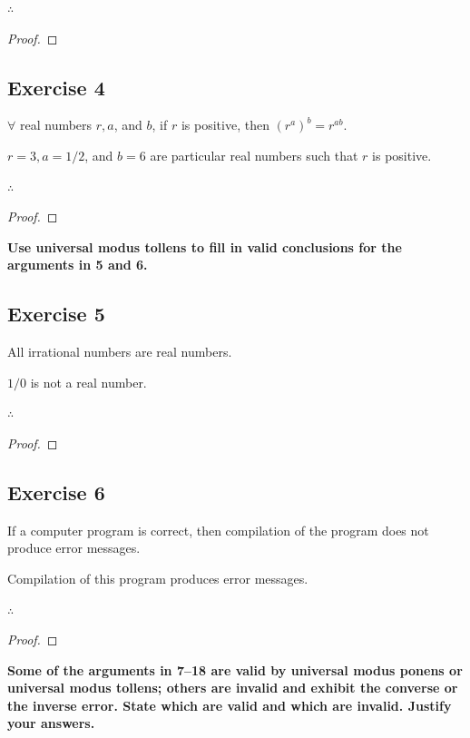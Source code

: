 \documentclass[14pt]{extarticle}
\newcommand{\fbl}{\underline{\hspace{1cm}}\,\,}
\newcommand{\fa}{\forall}
\begin{document}
$\therefore$ \fbl

\begin{proof}

\end{proof}

\subsection{Exercise 4}
$\fa$ real numbers $r, a$, and $b$, if $r$ is positive, then $(r^a)^b = r^{ab}$.

$r = 3, a = 1/2$, and $b = 6$ are particular real numbers such that $r$ is positive.

$\therefore$ \fbl

\begin{proof}

\end{proof}

{\bf \color{cyan} Use universal modus tollens to fill in valid conclusions for the arguments in 5 and 6.}

\subsection{Exercise 5}
All irrational numbers are real numbers.

$1/0$ is not a real number.

$\therefore$ \fbl

\begin{proof}

\end{proof}

\subsection{Exercise 6}
If a computer program is correct, then compilation of the program does not produce error messages.

Compilation of this program produces error messages.

$\therefore$ \fbl

\begin{proof}

\end{proof}

{\bf \color{cyan} Some of the arguments in 7–18 are valid by universal modus ponens or universal modus tollens; others are invalid and exhibit the converse or the inverse error. State which are valid and which are invalid. Justify your answers.}
\end{document}
